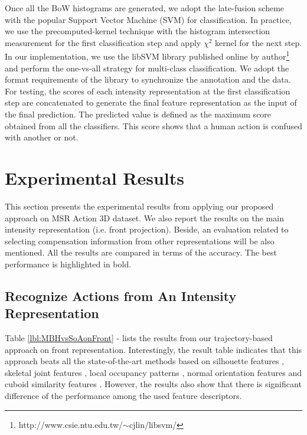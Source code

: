 \documentclass[review]{elsarticle}
\begin{document}
Once all the BoW histograms are generated, we adopt the late-fusion scheme with the popular Support Vector Machine (SVM) for classification. In practice, we use the precomputed-kernel technique with the histogram intersection measurement for the first classification step and apply $\chi^2$ kernel for the next step. In our implementation, we use the libSVM library published online by author\footnote{http://www.csie.ntu.edu.tw/$\sim$cjlin/libsvm/} and perform the one-vs-all strategy for multi-class classification. We adopt the format requirements of the library to synchronize the annotation and the data. For testing, the scores of each intensity representation at the first classification step are concatenated to generate the final feature representation as the input of the final prediction. The predicted value is defined as the maximum score obtained from all the classifiers. This score shows that a human action is confused with another or not.

\section{Experimental Results}

This section presents the experimental results from applying our proposed approach on MSR Action 3D dataset. We also report the results on the main intensity representation (i.e. front projection). Beside, an evaluation related to selecting compensation information from other representations will be also mentioned. All the results are compared in terms of the accuracy. The best performance is highlighted in bold.

\subsection{Recognize Actions from An Intensity Representation}

Table \ref{lbl:MBHvsSoAonFront} - lists the results from our trajectory-based approach on front representation. Interestingly, the result table indicates that this approach beats all the state-of-the-art methods based on silhouette features \cite{li2010action, yang2012recognizing}, skeletal joint features \cite{yang2012eigenjoints, wang2012mining}, local occupancy patterns \cite{wang2012robust, vieira2012stop}, normal orientation features \cite{oreifej2013hon4d} and cuboid similarity features \cite{xia2013spatio}. However, the results also show that there is significant difference of the performance among the used feature descriptors.
\end{document}
